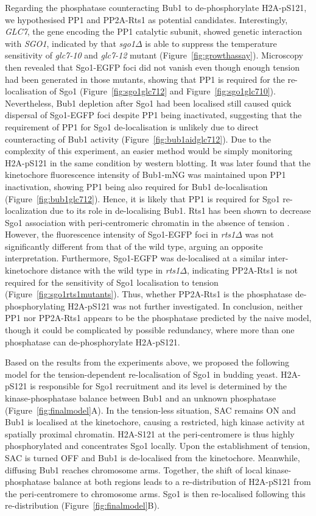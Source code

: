 Regarding the phosphatase counteracting Bub1 to de-phosphorylate H2A-pS121, we hypothesised PP1 and PP2A-Rts1 as potential candidates. Interestingly, \textit{GLC7}, the gene encoding the PP1 catalytic subunit, showed genetic interaction with \textit{SGO1}, indicated by that \textit{sgo1$\Delta$} is able to suppress the temperature sensitivity of \textit{glc7-10} and \textit{glc7-12} mutant (Figure~\ref{fig:growthassay}). Microscopy then revealed that Sgo1-EGFP foci did not vanish even though enough tension had been generated in those mutants, showing that PP1 is required for the re-localisation of Sgo1 (Figure~\ref{fig:sgo1glc712} and Figure~\ref{fig:sgo1glc710}). Nevertheless, Bub1 depletion after Sgo1 had been localised still caused quick dispersal of Sgo1-EGFP foci despite PP1 being inactivated, suggesting that the requirement of PP1 for Sgo1 de-localisation is unlikely due to direct counteracting of Bub1 activity (Figure~\ref{fig:bub1aidglc712}). Due to the complexity of this experiment, an easier method would be simply monitoring H2A-pS121 in the same condition by western blotting. It was later found that the kinetochore fluorescence intensity of Bub1-mNG was maintained upon PP1 inactivation, showing PP1 being also required for Bub1 de-localisation (Figure~\ref{fig:bub1glc712}). Hence, it is likely that PP1 is required for Sgo1 re-localization due to its role in de-localising Bub1. Rts1 has been shown to decrease Sgo1 association with peri-centromeric chromatin in the absence of tension \citep{Nerusheva2014}. However, the fluorescence intensity of Sgo1-EGFP foci in \textit{rts1$\Delta$} was not significantly different from that of the wild type, arguing an opposite interpretation. Furthermore, Sgo1-EGFP was de-localised at a similar inter-kinetochore distance with the wild type in \textit{rts1$\Delta$}, indicating PP2A-Rts1 is not required for the sensitivity of Sgo1 localisation to tension (Figure~\ref{fig:sgo1rts1mutants}). Thus, whether PP2A-Rts1 is the phosphatase de-phosphorylating H2A-pS121 was not further investigated. In conclusion, neither PP1 nor PP2A-Rts1 appears to be the phosphatase predicted by the naive model, though it could be complicated by possible redundancy, where more than one phosphatase can de-phosphorylate H2A-pS121. 

Based on the results from the experiments above, we proposed the following model for the tension-dependent re-localisation of Sgo1 in budding yeast. H2A-pS121 is responsible for Sgo1 recruitment and its level is determined by the kinase-phosphatase balance between Bub1 and an unknown phosphatase (Figure~\ref{fig:finalmodel}A). In the tension-less situation, SAC remains ON and Bub1 is localised at the kinetochore, causing a restricted, high kinase activity at spatially proximal chromatin. H2A-S121 at the peri-centromere is thus highly phosphorylated and concentrates Sgo1 locally. Upon the establishment of tension, SAC is turned OFF and Bub1 is de-localised from the kinetochore. Meanwhile, diffusing Bub1 reaches chromosome arms. Together, the shift of local kinase-phosphatase balance at both regions leads to a re-distribution of H2A-pS121 from the peri-centromere to chromosome arms. Sgo1 is then re-localised following this re-distribution (Figure~\ref{fig:finalmodel}B). 

